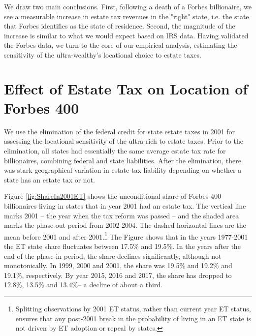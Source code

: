 \documentclass[12pt]{article}
\begin{document}
We draw two main conclusions.  First, following a death of a Forbes billionaire, we see a measurable increase in estate tax revenues in the "right" state, i.e. the state that Forbes identifies as the state of residence. Second, the magnitude of the increase is similar to what we would expect based on IRS data. Having validated the Forbes data, we turn to the core of our empirical analysis, estimating the sensitivity of the ultra-wealthy's locational choice to estate taxes.




\section{Effect of Estate Tax on Location of Forbes 400}
\label{section:EIeffects}
We use the elimination of the federal credit for state estate taxes in 2001 for assessing the locational sensitivity of the ultra-rich to estate taxes. Prior to the elimination, all states had essentially the same average estate tax rate for billionaires, combining federal and state liabilities. After the elimination, there was stark geographical variation in estate tax liability depending on whether a state has an estate tax or not.  

Figure \ref{fig:ShareIn2001ET} shows the unconditional share of Forbes 400 billionaires living in states that in year 2001 had an estate tax.   The vertical line marks 2001 -- the year when the tax reform was passed -- and the shaded area marks the phase-out period from 2002-2004. The dashed horizontal lines are the mean before 2001 and after 2001.\footnote{Splitting observations by 2001 ET status, rather than current year ET status, ensures that any post-2001 break in the probability of living in an ET state is not driven by ET adoption or repeal by states.}
The Figure shows that in the years 1977-2001 the ET state share fluctuates between 17.5\% and 19.5\%.  
In the years after the end of the phase-in period, the share declines significantly, although not monotonically.  In 1999, 2000 and 2001, the share was 19.5\% and 19.2\% and 19.1\%, respectively. By year 2015, 2016 and 2017, the share has dropped to 12.8\%, 13.5\% and 13.4\%-- a decline of about a third. 
\end{document}
